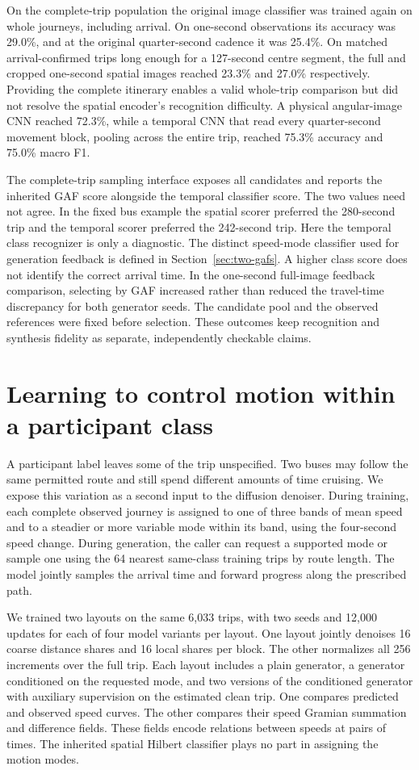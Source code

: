 On the complete-trip population the original image classifier was trained again on whole journeys, including arrival. On one-second observations its accuracy was 29.0\%, and at the original quarter-second cadence it was 25.4\%. On matched arrival-confirmed trips long enough for a 127-second centre segment, the full and cropped one-second spatial images reached 23.3\% and 27.0\% respectively. Providing the complete itinerary enables a valid whole-trip comparison but did not resolve the spatial encoder's recognition difficulty. A physical angular-image CNN reached 72.3\%, while a temporal CNN that read every quarter-second movement block, pooling across the entire trip, reached 75.3\% accuracy and 75.0\% macro F1.

The complete-trip sampling interface exposes all candidates and reports the inherited GAF score alongside the temporal classifier score. The two values need not agree. In the fixed bus example the spatial scorer preferred the 280-second trip and the temporal scorer preferred the 242-second trip. Here the temporal class recognizer is only a diagnostic. The distinct speed-mode classifier used for generation feedback is defined in Section~\ref{sec:two-gafs}. A higher class score does not identify the correct arrival time. In the one-second full-image feedback comparison, selecting by GAF increased rather than reduced the travel-time discrepancy for both generator seeds. The candidate pool and the observed references were fixed before selection. These outcomes keep recognition and synthesis fidelity as separate, independently checkable claims.

\section{Learning to control motion within a participant class}
A participant label leaves some of the trip unspecified. Two buses may follow the same permitted route and still spend different amounts of time cruising. We expose this variation as a second input to the diffusion denoiser. During training, each complete observed journey is assigned to one of three bands of mean speed and to a steadier or more variable mode within its band, using the four-second speed change. During generation, the caller can request a supported mode or sample one using the 64 nearest same-class training trips by route length. The model jointly samples the arrival time and forward progress along the prescribed path.

We trained two layouts on the same 6,033 trips, with two seeds and 12,000 updates for each of four model variants per layout. One layout jointly denoises 16 coarse distance shares and 16 local shares per block. The other normalizes all 256 increments over the full trip. Each layout includes a plain generator, a generator conditioned on the requested mode, and two versions of the conditioned generator with auxiliary supervision on the estimated clean trip. One compares predicted and observed speed curves. The other compares their speed Gramian summation and difference fields. These fields encode relations between speeds at pairs of times. The inherited spatial Hilbert classifier plays no part in assigning the motion modes.

